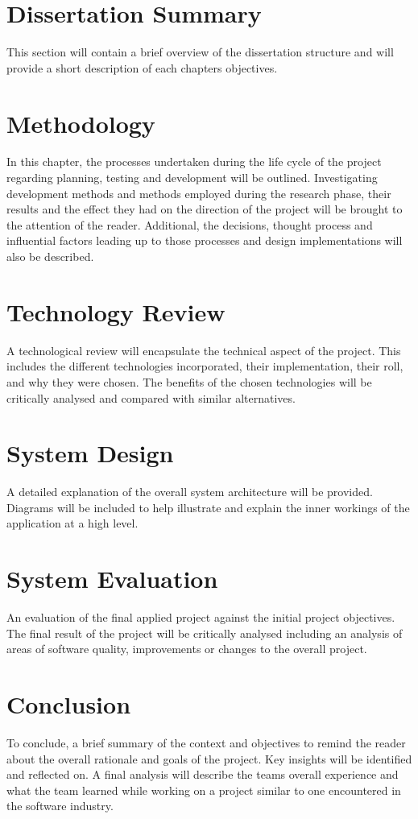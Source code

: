 \section{Dissertation Summary}
This section will contain a brief overview of the dissertation structure and will provide a short description of each chapters objectives.

\section{Methodology}
In this chapter, the processes undertaken during the life cycle of the project regarding planning, testing and development will be outlined. Investigating development methods and methods employed during the research phase, their results and the effect they had on the direction of the project will be brought to the attention of the reader. Additional, the decisions, thought process and influential factors leading up to those processes and design implementations will also be described.

\section{Technology Review}
A technological review will encapsulate the technical aspect of the project. This includes the different technologies incorporated, their implementation, their roll, and why they were chosen. The benefits of the chosen technologies will be critically analysed and compared with similar alternatives. 

\section{System Design}
A detailed explanation of the overall system architecture will be provided. Diagrams will be included to help illustrate and explain the inner workings of the application at a high level.

\section{System Evaluation}
An evaluation of the final applied project against the initial project objectives. The final result of the project will be critically analysed including an analysis of areas of software quality, improvements or changes to the overall project.

\section{Conclusion}
To conclude, a brief summary of the context and objectives to remind the reader about the overall rationale and goals of the project. Key insights will be identified and reflected on. A final analysis will describe the teams overall experience and what the team learned while working on a project similar to one encountered in the software industry. 


